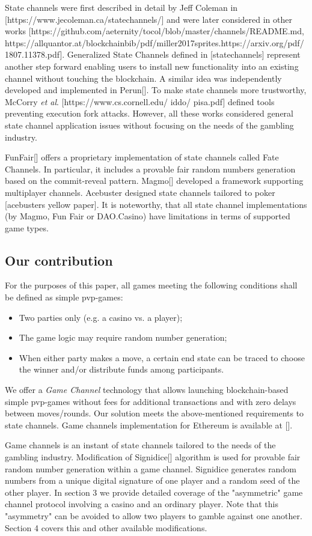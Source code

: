 	State channels were first described in detail by Jeff Coleman in [https://www.jecoleman.ca/statechannels/] and were later considered in other works [https://github.com/aeternity/tocol/blob/master/channels/README.md, https://allquantor.at/blockchainbib/pdf/miller2017sprites.https://arxiv.org/pdf/1807.11378.pdf]. Generalized State Channels defined in [statechannels] represent another step forward enabling users to install new functionality into an existing channel without touching the blockchain. A similar idea was independently developed and implemented in Perun[]. To make state channels more trustworthy, McCorry \textit {et al}. [https://www.cs.cornell.edu/ iddo/ pisa.pdf] defined tools preventing execution fork attacks. However, all these works considered general state channel application issues without focusing on the needs of the gambling industry.

	FunFair[] offers a proprietary implementation of state channels called Fate Channels. In particular, it includes a provable fair random numbers generation based on the commit-reveal pattern. Magmo[] developed a framework supporting multiplayer channels. Acebuster designed  state channels tailored to poker [acebusters yellow paper]. It is noteworthy, that all state channel implementations (by Magmo, Fun Fair or DAO.Casino) have limitations in terms of supported game types.

		\subsection {Our contribution}
	For the purposes of this paper, all games meeting the following conditions shall be defined as simple pvp-games:
	\begin{itemize}
		\item Two parties only (e.g. a casino vs. a player);
		\item The game logic may require random number generation;
		\item When either party makes a move, a certain end state can be traced to choose the winner and/or distribute funds among participants.
	\end{itemize}
	We offer a \textit {Game Channel} technology that allows launching blockchain-based simple pvp-games without fees for additional transactions and with zero delays between moves/rounds. Our solution meets the above-mentioned requirements to state channels. Game channels implementation for Ethereum is available at [].

	Game channels is an instant of state channels tailored to the needs of the gambling industry. Modification of Signidice[]
algorithm is used for provable fair random number generation within a game channel. Signidice generates random numbers from a unique digital signature of one player and a random seed of the other player. In section 3 we provide detailed coverage of the "asymmetric" game channel protocol involving a casino and an ordinary player. Note that this "asymmetry" can be avoided to allow two players to gamble against one another. Section 4 covers this and other available modifications.